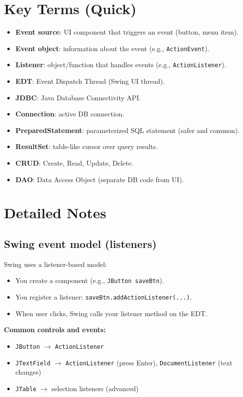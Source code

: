 \documentclass[11pt]{article}
\begin{document}
\section{Key Terms (Quick)}
\begin{itemize}
  \item \textbf{Event source}: UI component that triggers an event (button, menu item).
  \item \textbf{Event object}: information about the event (e.g., \texttt{ActionEvent}).
  \item \textbf{Listener}: object/function that handles events (e.g., \texttt{ActionListener}).
  \item \textbf{EDT}: Event Dispatch Thread (Swing UI thread).
  \item \textbf{JDBC}: Java Database Connectivity API.
  \item \textbf{Connection}: active DB connection.
  \item \textbf{PreparedStatement}: parameterized SQL statement (safer and common).
  \item \textbf{ResultSet}: table-like cursor over query results.
  \item \textbf{CRUD}: Create, Read, Update, Delete.
  \item \textbf{DAO}: Data Access Object (separate DB code from UI).
\end{itemize}

\section{Detailed Notes}
\subsection{Swing event model (listeners)}
Swing uses a listener-based model:
\begin{itemize}
  \item You create a component (e.g., \texttt{JButton saveBtn}).
  \item You register a listener: \texttt{saveBtn.addActionListener(...)}.
  \item When user clicks, Swing calls your listener method on the EDT.
\end{itemize}

\textbf{Common controls and events:}
\begin{itemize}
  \item \texttt{JButton} $\rightarrow$ \texttt{ActionListener}
  \item \texttt{JTextField} $\rightarrow$ \texttt{ActionListener} (press Enter), \texttt{DocumentListener} (text changes)
  \item \texttt{JTable} $\rightarrow$ selection listeners (advanced)
\end{itemize}
\end{document}
